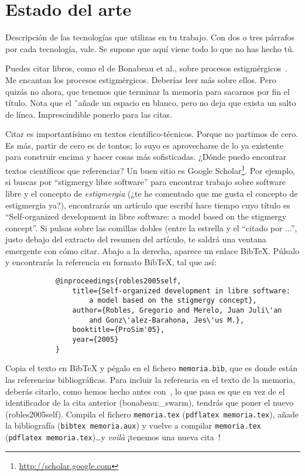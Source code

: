 \documentclass[a4paper, 12pt]{book}
\begin{document}
	\chapter{Estado del arte}
	\label{chap:estado}
	
	Descripción de las tecnologías que utilizas en tu trabajo. 
	Con dos o tres párrafos por cada tecnología, vale. 
	Se supone que aquí viene todo lo que no has hecho tú.
	
	Puedes citar libros, como el de Bonabeau et al., sobre procesos estigmérgicos~\cite{bonabeau:_swarm}. 
	Me encantan los procesos estigmérgicos.
	Deberías leer más sobre ellos.
	Pero quizás no ahora, que tenemos que terminar la memoria para sacarnos por fin el título.
	Nota que el \~ \ añade un espacio en blanco, pero no deja que exista un salto de línea. 
	Imprescindible ponerlo para las citas.
	
	Citar es importantísimo en textos científico-técnicos. 
	Porque no partimos de cero.
	Es más, partir de cero es de tontos; lo suyo es aprovecharse de lo ya existente para construir encima y hacer cosas más sofisticadas.
	¿Dónde puedo encontrar textos científicos que referenciar?
	Un buen sitio es Google Scholar\footnote{\url{http://scholar.google.com}}.
	Por ejemplo, si buscas por ``stigmergy libre software'' para encontrar trabajo sobre software libre y el concepto de \emph{estigmergia} (¿te he comentado que me gusta el concepto de estigmergia ya?), encontrarás un artículo que escribí hace tiempo cuyo título es ``Self-organized development in libre software: a model based on the stigmergy concept''.
	Si pulsas sobre las comillas dobles (entre la estrella y el ``citado por ...'', justo debajo del extracto del resumen del artículo, te saldrá una ventana emergente con cómo citar.
	Abajo a la derecha, aparece un enlace BibTeX.
	Púlsalo y encontrarás la referencia en formato BibTeX, tal que así:
	
	{\footnotesize
		\begin{verbatim}
			@inproceedings{robles2005self,
				title={Self-organized development in libre software:
					a model based on the stigmergy concept},
				author={Robles, Gregorio and Merelo, Juan Juli\'an 
					and Gonz\'alez-Barahona, Jes\'us M.},
				booktitle={ProSim'05},
				year={2005}
			}
		\end{verbatim}
	}
	
	Copia el texto en BibTeX y pégalo en el fichero \texttt{memoria.bib}, que es donde están las referencias bibliográficas.
	Para incluir la referencia en el texto de la memoria, deberás citarlo, como hemos hecho antes con~\cite{bonabeau:_swarm}, lo que pasa es que en vez de el identificador de la cita anterior (bonabeau:\_swarm), tendrás que poner el nuevo (robles2005self).
	Compila el fichero \texttt{memoria.tex} (\texttt{pdflatex memoria.tex}), añade la bibliografía (\texttt{bibtex memoria.aux}) y vuelve a compilar \texttt{memoria.tex} (\texttt{pdflatex memoria.tex})\ldots y \emph{voilà} ¡tenemos una nueva cita~\cite{robles2005self}!
	
\end{document}
